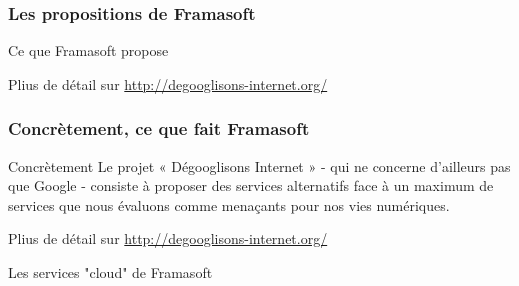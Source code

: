 \documentclass{beamer}
\begin{document}
\begin{frame}
\frametitle{Les propositions de Framasoft}

\begin{block}{Ce que Framasoft propose}
\end{block}
Plius de détail sur \url{http://degooglisons-internet.org/}
\end{frame}

\begin{frame}
\frametitle{Concrètement, ce que fait Framasoft}

\begin{block}{Concrètement}
Le projet « Dégooglisons Internet » - qui ne concerne d'ailleurs pas que Google - consiste à proposer des services alternatifs face à un maximum de services que nous évaluons comme menaçants pour nos vies numériques.
\end{block}
Plius de détail sur \url{http://degooglisons-internet.org/}
\end{frame}

\begin{frame}
\Huge{\centerline{Les services "cloud" de Framasoft}}
\end{frame}
\end{document}
